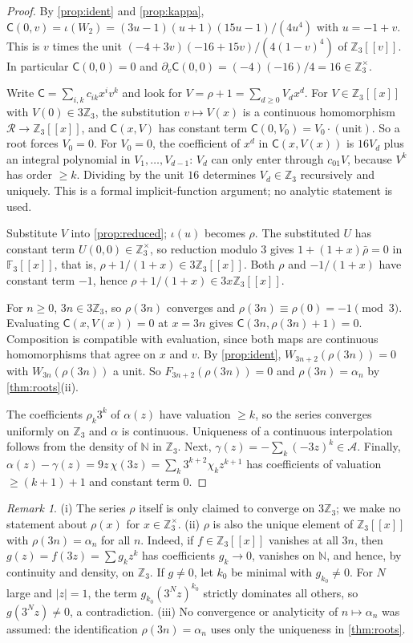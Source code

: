 \documentclass[11pt,reqno]{amsart}
\theoremstyle{definition}
\theoremstyle{remark}
\newtheorem{remark}[theorem]{Remark}
\theoremstyle{plain}
\newcommand{\Z}{\mathbb Z}
\newcommand{\N}{\mathbb N}
\newcommand{\F}{\mathbb F}
\newcommand{\RR}{\mathscr R}
\newcommand{\sC}{\mathsf C}
\newcommand{\cA}{\mathcal A}
\begin{document}
\begin{proof}
By \cref{prop:ident} and \cref{prop:kappa}, $\sC(0,v)=\iota(W_2)=(3u-1)(u+1)(15u-1)/(4u^4)$ with $u=-1+v$. This is $v$ times the unit $(-4+3v)(-16+15v)/(4(1-v)^4)$ of $\Z_3[[v]]$. In particular $\sC(0,0)=0$ and $\partial_v\sC(0,0)=(-4)(-16)/4=16\in\Z_3^\times$.

Write $\sC=\sum_{i,k}c_{ik}x^iv^k$ and look for $V=\rho+1=\sum_{d\ge0}V_dx^d$. For $V\in\Z_3[[x]]$ with $V(0)\in3\Z_3$, the substitution $v\mapsto V(x)$ is a continuous homomorphism $\RR\to\Z_3[[x]]$, and $\sC(x,V)$ has constant term $\sC(0,V_0)=V_0\cdot(\text{unit})$. So a root forces $V_0=0$. For $V_0=0$, the coefficient of $x^d$ in $\sC(x,V(x))$ is $16V_d$ plus an integral polynomial in $V_1,\dots,V_{d-1}$: $V_d$ can only enter through $c_{01}V$, because $V^k$ has order $\ge k$. Dividing by the unit $16$ determines $V_d\in\Z_3$ recursively and uniquely. This is a formal implicit-function argument; no analytic statement is used.

Substitute $V$ into \cref{prop:reduced}; $\iota(u)$ becomes $\rho$. The substituted $U$ has constant term $U(0,0)\in\Z_3^\times$, so reduction modulo $3$ gives $1+(1+x)\bar\rho=0$ in $\F_3[[x]]$, that is, $\rho+1/(1+x)\in3\Z_3[[x]]$. Both $\rho$ and $-1/(1+x)$ have constant term $-1$, hence $\rho+1/(1+x)\in3x\Z_3[[x]]$.

For $n\ge0$, $3n\in3\Z_3$, so $\rho(3n)$ converges and $\rho(3n)\equiv\rho(0)=-1\pmod 3$. Evaluating $\sC(x,V(x))=0$ at $x=3n$ gives $\sC(3n,\rho(3n)+1)=0$. Composition is compatible with evaluation, since both maps are continuous homomorphisms that agree on $x$ and $v$. By \cref{prop:ident}, $W_{3n+2}(\rho(3n))=0$ with $W_{3n}(\rho(3n))$ a unit. So $F_{3n+2}(\rho(3n))=0$ and $\rho(3n)=\alpha_n$ by \cref{thm:roots}(ii).

The coefficients $\rho_k3^k$ of $\alpha(z)$ have valuation $\ge k$, so the series converges uniformly on $\Z_3$ and $\alpha$ is continuous. Uniqueness of a continuous interpolation follows from the density of $\N$ in $\Z_3$. Next, $\gamma(z)=-\sum_k(-3z)^k\in\cA$. Finally, $\alpha(z)-\gamma(z)=9z\,\chi(3z)=\sum_k3^{k+2}\chi_kz^{k+1}$ has coefficients of valuation $\ge(k+1)+1$ and constant term $0$.
\end{proof}

\begin{remark}
(i) The series $\rho$ itself is only claimed to converge on $3\Z_3$; we make no statement about $\rho(x)$ for $x\in\Z_3^\times$. (ii) $\rho$ is also the unique element of $\Z_3[[x]]$ with $\rho(3n)=\alpha_n$ for all $n$. Indeed, if $f\in\Z_3[[x]]$ vanishes at all $3n$, then $g(z)=f(3z)=\sum g_kz^k$ has coefficients $g_k\to0$, vanishes on $\N$, and hence, by continuity and density, on $\Z_3$. If $g\ne0$, let $k_0$ be minimal with $g_{k_0}\ne0$. For $N$ large and $|z|=1$, the term $g_{k_0}(3^Nz)^{k_0}$ strictly dominates all others, so $g(3^Nz)\neq0$, a contradiction. (iii) No convergence or analyticity of $n\mapsto\alpha_n$ was assumed: the identification $\rho(3n)=\alpha_n$ uses only the uniqueness in \cref{thm:roots}.
\end{remark}
\end{document}
